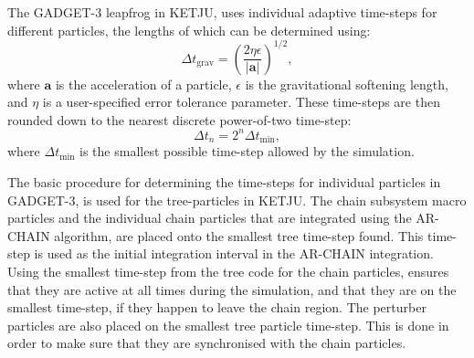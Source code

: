 \documentclass[english, twoside]{HYgradu}
\begin{document}
The GADGET-3 leapfrog in KETJU, uses individual adaptive time-steps for different particles, the lengths of which can be determined using:
\begin{equation}
\Delta t_\mathrm{grav} = \left(\frac{2\eta \epsilon}{|\mathbf{a}|} \right)^{1/2},
\end{equation}
where $\mathbf{a}$ is the acceleration of a particle, $\epsilon$ is the gravitational softening length, and $\eta$ is a user-specified error tolerance parameter. These time-steps are then rounded down to the nearest discrete power-of-two time-step:
\begin{equation}
\Delta t_n = 2^n \Delta t_\mathrm{min},
\end{equation}
where $\Delta t_\mathrm{min}$ is the smallest possible time-step allowed by the simulation. 

The basic procedure for determining the time-steps for individual particles in GADGET-3, is used for the tree-particles in KETJU. The chain subsystem macro particles and the individual chain particles that are integrated using the AR-CHAIN algorithm, are placed onto the smallest tree time-step found. This time-step is used as the initial integration interval in the AR-CHAIN integration. Using the smallest time-step from the tree code for the chain particles, ensures that they are active at all times during the simulation, and that they are on the smallest time-step, if they happen to leave the chain region. The perturber particles are also placed on the smallest tree particle time-step. This is done in order to make sure that they are synchronised with the chain particles. 



\end{document}
